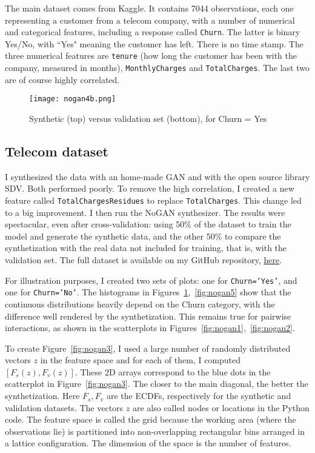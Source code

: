 \documentclass[oneside,10pt]{book}
\begin{document}
The main dataset comes from Kaggle. It contains 7044 observations, each one representing a customer from a telecom company,
 with a number of numerical and categorical features, including a response called \texttt{Churn}. The latter is binary Yes/No, with ``Yes" meaning the customer has left.
 There is no time stamp. The three numerical features are \texttt{tenure} (how long the customer has been with the company, measured in months), \texttt{MonthlyCharges} and \texttt{TotalCharges}. The last two are of course highly correlated. 

\begin{figure}[H]
\centering
\texttt{[image: nogan4b.png]} %
\caption{Synthetic (top) versus validation set (bottom), for Churn = Yes}
\label{fig:nogan4}
\end{figure}



\subsection{Telecom dataset}

I synthesized the data with an home-made GAN and with the open source library SDV. Both performed poorly. To remove the high correlation, I created a new feature called \texttt{TotalChargesResidues} to replace \texttt{TotalCharges}. This change led to a big improvement. I then
 run the NoGAN synthesizer. The results were spectacular, even after cross-validation: using 50\% of the dataset to train the model and generate the synthetic data, and the other 50\% 
 to compare the synthetization with the real data not included for training, that is,  with the \textcolor{index}{validation set}. The full dataset is available on my GitHub repository, \href{https://github.com/VincentGranville/Main/blob/main/Telecom.csv}{here}.




 
For illustration purposes, I created two sets of plots: one for \texttt{Churn='Yes'}, and one for \texttt{Churn='No'}. 
The histograms in Figures~\ref{fig:nogan4},~\ref{fig:nogan5} show that the continuous distributions heavily depend on the Churn category, with the difference well rendered by the synthetization. This remains true for pairwise interactions, as shown in the scatterplots
 in Figures~\ref{fig:nogan1},~\ref{fig:nogan2}.

To create Figure~\ref{fig:nogan3}, I used a large number of randomly distributed vectors  $z$ in the feature space and for each of them, I computed $[F_s(z), F_v(z)]$. These 2D arrays correspond to the blue dots in the scatterplot in Figure~\ref{fig:nogan3}. The closer to the main diagonal, the better the synthetization. Here $F_s, F_v$ are the ECDFs, respectively for the synthetic and validation datasets.
The vectors $z$ are also called nodes or locations in the Python code.  The feature space is called the grid because the working area (where the observations lie) is partitioned into non-overlapping rectangular bins arranged in a lattice configuration. The dimension of the space is the number of features. 
\end{document}
